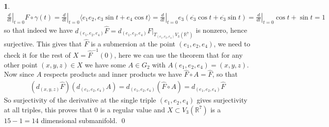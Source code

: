 \documentclass[10.5pt]{article}
\theoremstyle{definition}
\newtheorem{pb}{}
\newcommand{\gen}[1]{\langle#1\rangle}
\begin{document}
\begin{pb}
        \begin{align*}
            \left.\frac{d}{dt}\right\vert_{t=0}F\circ\gamma(t) = \left.\frac{d}{dt}\right\vert_{t=0} \gen{e_1e_2,e_3\sin t + e_4\cos t} = \left.\frac{d}{dt}\right\vert_{t=0}e_3(\overline{e_3}\cos t + \overline{e_3}\sin t) = \left.\frac{d}{dt}\right\vert_{t=0} \cos t + \sin t = 1
        \end{align*}
        so that indeed we have \(d_{(e_1,e_2,e_4)}\hat{F} = d_{(e_1,e_2,e_4)}F\vert_{T_{(e_1,e_2,e_4)}V_3(\mathbb{R}^7)}\) is nonzero, hence surjective. This gives that \(\hat{F}\) is a submersion at the point \((e_1,e_2,e_4)\), we need to check it for the rest of \(X = \hat{F}^{-1}(0)\), here we can use the theorem that for any other point \((x,y,z) \in X\) we have some \(A \in G_2\) with \(A(e_1,e_2,e_4) = (x,y,z)\). Now since \(A\) respects products and inner products we have \(\hat{F}\circ A = \hat{F}\), so that
        \begin{align*}
            (d_{(x,y,z)}\hat{F})(d_{(e_1,e_2,e_4)}A) = d_{(e_1,e_2,e_4)}(\hat{F}\circ A) = d_{(e_1,e_2,e_4)}\hat{F}
        \end{align*}
        So surjectivity of the derivative at the single triple \((e_1,e_2,e_4)\) gives surjectivity at all triples, this proves that \(0\) is a regular value and \(X \subset V_3(\mathbb{R}^7)\) is a \(15 - 1 = 14\) dimensional submanifold. \qed


\end{pb}
\end{document}
